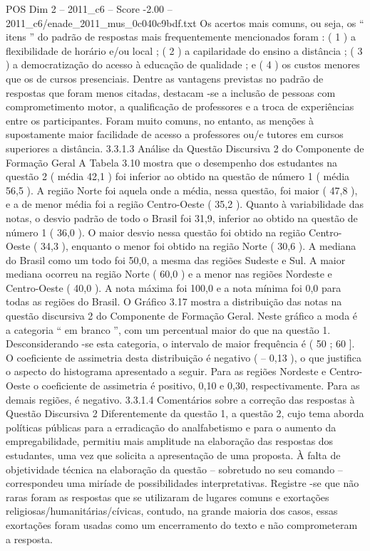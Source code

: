 \begin{textsample}{POS Dim 2 – 2011\_c6 – Score -2.00 – 2011\_c6/enade\_2011\_mus\_0c040c9bdf.txt}
Os acertos mais comuns, ou seja, os “ itens ” do padrão de respostas mais frequentemente mencionados foram : ( 1 ) a flexibilidade de horário e/ou local ; ( 2 ) a capilaridade do ensino a distância ; ( 3 ) a democratização do acesso à educação de qualidade ; e ( 4 ) os custos menores que os de cursos presenciais.
Dentre as vantagens previstas no padrão de respostas que foram menos citadas, destacam -se a inclusão de pessoas com comprometimento motor, a qualificação de professores e a troca de experiências entre os participantes.
Foram muito comuns, no entanto, as menções à supostamente maior facilidade de acesso a professores ou/e tutores em cursos superiores a distância. 3.3.1.3 Análise da Questão Discursiva 2 do Componente de Formação Geral A Tabela 3.10 mostra que o desempenho dos estudantes na questão 2 ( média 42,1 ) foi inferior ao obtido na questão de número 1 ( média 56,5 ).
A região Norte foi aquela onde a média, nessa questão, foi maior ( 47,8 ), e a de menor média foi a região Centro-Oeste ( 35,2 ).
Quanto à variabilidade das notas, o desvio padrão de todo o Brasil foi 31,9, inferior ao obtido na questão de número 1 ( 36,0 ).
O maior desvio nessa questão foi obtido na região Centro-Oeste ( 34,3 ), enquanto o menor foi obtido na região Norte ( 30,6 ).
A mediana do Brasil como um todo foi 50,0, a mesma das regiões Sudeste e Sul.
A maior mediana ocorreu na região Norte ( 60,0 ) e a menor nas regiões Nordeste e Centro-Oeste ( 40,0 ).
A nota máxima foi 100,0 e a nota mínima foi 0,0 para todas as regiões do Brasil.
O Gráfico 3.17 mostra a distribuição das notas na questão discursiva 2 do Componente de Formação Geral.
Neste gráfico a moda é a categoria “ em branco ”, com um percentual maior do que na questão 1.
Desconsiderando -se esta categoria, o intervalo de maior frequência é ( 50 ; 60 ].
O coeficiente de assimetria desta distribuição é negativo ( – 0,13 ), o que justifica o aspecto do histograma apresentado a seguir.
Para as regiões Nordeste e Centro-Oeste o coeficiente de assimetria é positivo, 0,10 e 0,30, respectivamente.
Para as demais regiões, é negativo. 3.3.1.4 Comentários sobre a correção das respostas à Questão Discursiva 2 Diferentemente da questão 1, a questão 2, cujo tema aborda políticas públicas para a erradicação do analfabetismo e para o aumento da empregabilidade, permitiu mais amplitude na elaboração das respostas dos estudantes, uma vez que solicita a apresentação de uma proposta.
À falta de objetividade técnica na elaboração da questão – sobretudo no seu comando – correspondeu uma miríade de possibilidades interpretativas.
Registre -se que não raras foram as respostas que se utilizaram de lugares comuns e exortações religiosas/humanitárias/cívicas, contudo, na grande maioria dos casos, essas exortações foram usadas como um encerramento do texto e não comprometeram a resposta.

\end{textsample}
